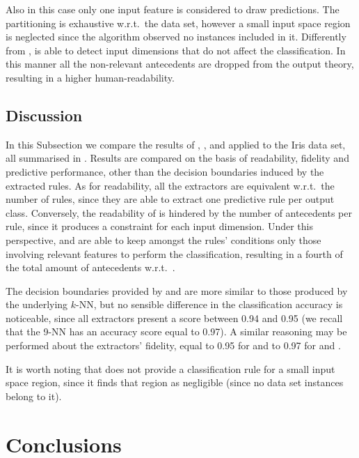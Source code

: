 \documentclass[
]{ceurart}
\begin{document}

Also in this case only one input feature is considered to draw predictions.
%
The partitioning is exhaustive w.r.t.\ the data set, however a small input space region is neglected since the algorithm observed no instances included in it.
%
Differently from \iter{}, \gridex{} is able to detect input dimensions that do not affect the classification.
%
In this manner all the non-relevant antecedents are dropped from the output theory, resulting in a higher human-readability.

\subsection{Discussion}



In this Subsection we compare the results of \cart{}, \iter{}, and \gridex{} applied to the Iris data set, all summarised in .
%
Results are compared on the basis of readability, fidelity and predictive performance, other than the decision boundaries induced by the extracted rules.
%
As for readability, all the extractors are equivalent w.r.t.\ the number of rules, since they are able to extract one predictive rule per output class.
%
Conversely, the readability of \iter{} is hindered by the number of antecedents per rule, since it produces a constraint for each input dimension.
%
Under this perspective, \cart{} and \gridex{} are able to keep amongst the rules' conditions only those involving relevant features to perform the classification, resulting in a fourth of the total amount of antecedents w.r.t.\ \iter{}.

The decision boundaries provided by \gridex{} and \iter{} are more similar to those produced by the underlying $k$-NN, but no sensible difference in the classification accuracy is noticeable, since all extractors present a score between 0.94 and 0.95 (we recall that the 9-NN has an accuracy score equal to 0.97).
%
A similar reasoning may be performed about the extractors' fidelity, equal to 0.95 for \cart{} and to 0.97 for \iter{} and \gridex{}.

It is worth noting that \gridex{} does not provide a classification rule for a small input space region, since it finds that region as negligible (since no data set instances belong to it).

\section{Conclusions}
\end{document}
